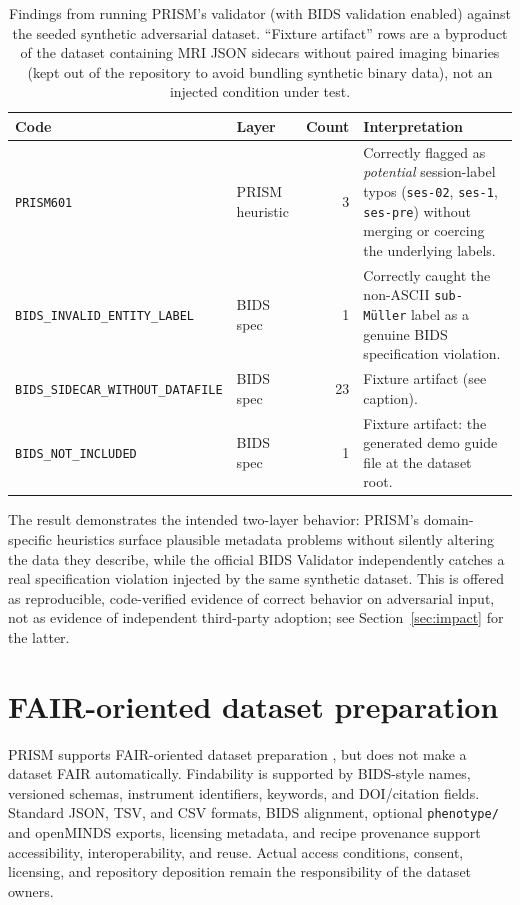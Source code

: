 \documentclass[10pt]{article}
\begin{document}
\begin{table}[htbp]
  \centering
  \caption{Findings from running PRISM's validator (with BIDS validation
  enabled) against the seeded synthetic adversarial dataset. ``Fixture
  artifact'' rows are a byproduct of the dataset containing MRI JSON
  sidecars without paired imaging binaries (kept out of the repository to
  avoid bundling synthetic binary data), not an injected condition under
  test.}
  \label{tab:validation}
  \begin{tabular}{@{}llrl@{}}
    \toprule
    Code & Layer & Count & Interpretation \\
    \midrule
    \texttt{PRISM601} & PRISM heuristic & 3 & Correctly flagged as
      \emph{potential} session-label typos (\texttt{ses-02}, \texttt{ses-1},
      \texttt{ses-pre}) without merging or coercing the underlying labels. \\
    \texttt{BIDS\_INVALID\_ENTITY\_LABEL} & BIDS spec & 1 & Correctly caught
      the non-ASCII \texttt{sub-M\"uller} label as a genuine BIDS
      specification violation. \\
    \texttt{BIDS\_SIDECAR\_WITHOUT\_DATAFILE} & BIDS spec & 23 & Fixture
      artifact (see caption). \\
    \texttt{BIDS\_NOT\_INCLUDED} & BIDS spec & 1 & Fixture artifact: the
      generated demo guide file at the dataset root. \\
    \bottomrule
  \end{tabular}
\end{table}

The result demonstrates the intended two-layer behavior: PRISM's
domain-specific heuristics surface plausible metadata problems without
silently altering the data they describe, while the official BIDS Validator
independently catches a real specification violation injected by the same
synthetic dataset. This is offered as reproducible, code-verified evidence
of correct behavior on adversarial input, not as evidence of independent
third-party adoption; see Section~\ref{sec:impact} for the latter.

\section{FAIR-oriented dataset preparation}

PRISM supports FAIR-oriented dataset preparation \citep{wilkinson2016fair},
but does not make a dataset FAIR automatically. Findability is supported by
BIDS-style names, versioned schemas, instrument identifiers, keywords, and
DOI/citation fields. Standard JSON, TSV, and CSV formats, BIDS alignment,
optional \texttt{phenotype/} and openMINDS exports, licensing metadata, and
recipe provenance support accessibility, interoperability, and reuse. Actual
access conditions, consent, licensing, and repository deposition remain the
responsibility of the dataset owners.
\end{document}
